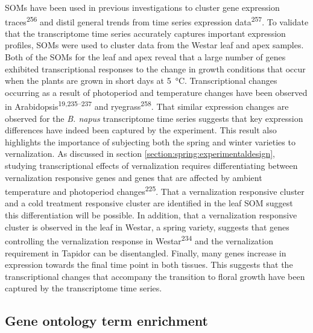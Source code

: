 \documentclass[12pt,]{book}
\begin{document}
SOMs have been used in previous investigations to cluster gene
expression traces\textsuperscript{256} and distil general trends from
time series expression data\textsuperscript{257}. To validate that the
transcriptome time series accurately captures important expression
profiles, SOMs were used to cluster data from the Westar leaf and apex
samples. Both of the SOMs for the leaf and apex reveal that a large
number of genes exhibited transcriptional responses to the change in
growth conditions that occur when the plants are grown in short days at
5~°C. Transcriptional changes occurring as a result of photoperiod and
temperature changes have been observed in
Arabidopsis\textsuperscript{19,235--237} and
ryegrass\textsuperscript{258}. That similar expression changes are
observed for the \emph{B. napus} transcriptome time series suggests that
key expression differences have indeed been captured by the experiment.
This result also highlights the importance of subjecting both the spring
and winter varieties to vernalization. As discussed in section
\ref{section:spring:experimentaldesign}, studying transcriptional
effects of vernalization requires differentiating between vernalization
responsive genes and genes that are affected by ambient temperature and
photoperiod changes\textsuperscript{225}. That a vernalization
responsive cluster and a cold treatment responsive cluster are
identified in the leaf SOM suggest this differentiation will be
possible. In addition, that a vernalization responsive cluster is
observed in the leaf in Westar, a spring variety, suggests that genes
controlling the vernalization response in Westar\textsuperscript{234}
and the vernalization requirement in Tapidor can be disentangled.
Finally, many genes increase in expression towards the final time point
in both tissues. This suggests that the transcriptional changes that
accompany the transition to floral growth have been captured by the
transcriptome time series.

\subsection{Gene ontology term
enrichment}\label{section:spring:gotermenrichment}
\end{document}
